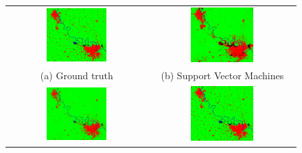 \documentclass[12pt, a4paper]{report}
\begin{document}
\begin{figure}
\begin{center}
\begin{tabular}{cc}
  \includegraphics[width=0.45\textwidth]{train_gt} &   \includegraphics[width=0.45\textwidth]{svmresult.png} \\
(a) Ground truth & (b) Support Vector Machines \\[6pt]
 \includegraphics[width=0.45\textwidth]{knnresult.png} &   \includegraphics[width=0.45\textwidth]{decisiontreeresult.png} \\

\end{tabular}
\end{center}
\end{figure}
\end{document}
